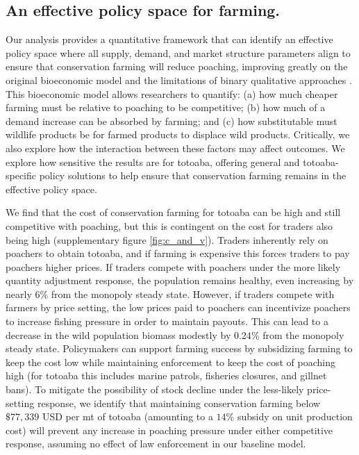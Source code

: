 \subsection{An effective policy space for farming.}

Our analysis provides a quantitative framework that can identify an effective policy space where all supply, demand, and market structure parameters align to ensure that conservation farming will reduce poaching, improving greatly on the original bioeconomic model and the limitations of binary qualitative approaches \citep{phelps_framework_2014,tensen_under_2016, bulte_economic_2005, damania_economics_2007, challender_evaluating_2019}. This bioeconomic model allows researchers to quantify: (a) how much cheaper farming must be relative to poaching to be competitive; (b) how much of a demand increase can be absorbed by farming; and (c) how substitutable must wildlife products be for farmed products to displace wild products. Critically, we also explore how the interaction between these factors may affect outcomes. We explore how sensitive the results are for totoaba, offering general and totoaba-specific policy solutions to help ensure that conservation farming remains in the effective policy space.

We find that the cost of conservation farming for totoaba can be high and still competitive with poaching, but this is contingent on the cost for traders also being high (supplementary figure \ref{fig:c_and_v}). Traders inherently rely on poachers to obtain totoaba, and if farming is expensive this forces traders to pay poachers higher prices. If traders compete with poachers under the more likely quantity adjustment response, the population remains healthy, even increasing by nearly $6\%$ from the monopoly steady state. However, if traders compete with farmers by price setting, the low prices paid to poachers can incentivize poachers to increase fishing pressure in order to maintain payouts. This can lead to a decrease in the wild population biomass modestly by $0.24\%$ from the monopoly steady state. Policymakers can support farming success by subsidizing farming to keep the cost low while maintaining enforcement to keep the cost of poaching high (for totoaba this includes marine patrols, fisheries closures, and gillnet bans). To mitigate the possibility of stock decline under the less-likely price-setting response, we identify that maintaining conservation farming below $\$77,339$ USD per mt of totoaba (amounting to a $14\%$ subsidy on unit production cost) will prevent any increase in poaching pressure under either competitive response, assuming no effect of law enforcement in our baseline model.


